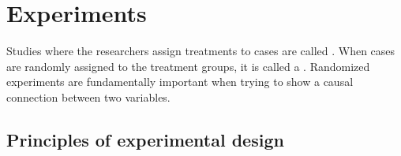 

\section{Experiments}
\label{experimentsSection}

Studies where the researchers assign treatments to cases are called . When cases are randomly assigned to the treatment groups, it is called a . Randomized experiments are fundamentally important when trying to show a causal connection between two variables.

\subsection{Principles of experimental design}
\label{experimentalDesignPrinciples}


